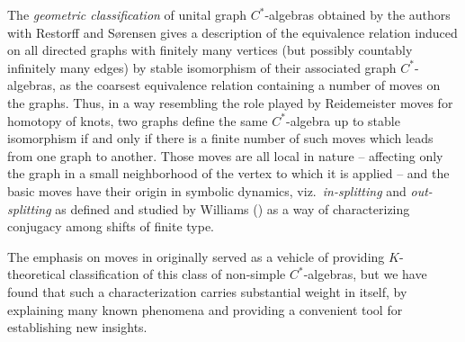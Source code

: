 \documentclass[12pt]{amsbook}%
\theoremstyle{defin}
\theoremstyle{remark}
\numberwithin{equation}{chapter}
\numberwithin{theor}{section}
\begin{document}
The \emph{geometric classification} of unital graph $C^*$-algebras obtained by the authors with Restorff and S\o{}rensen  gives a description of the equivalence relation induced on all directed graphs with finitely many vertices (but possibly countably infinitely many edges) by stable isomorphism of their associated graph $C^*$-algebras, as the coarsest equivalence relation containing a number of moves on the graphs. Thus, in a way resembling the role played by Reidemeister moves for homotopy of knots, two graphs define the same $C^*$-algebra up to stable isomorphism if and only if there is a finite number of such moves which leads  from one graph to another. Those moves are all local in nature -- affecting only the graph in a small neighborhood of the vertex to which it is applied -- and the basic moves have their origin in symbolic dynamics, viz.\ \emph{in-splitting} and \emph{out-splitting} as defined and studied by Williams (\cite{rfw:csft}) as a way of characterizing conjugacy among shifts of finite type.

The emphasis on moves in \cite{segrerapws:ccuggs} originally served as a vehicle of providing $K$-theoretical classification of this class of non-simple 	$C^*$-algebras, but we have found that such a characterization carries substantial weight in itself, by explaining many known phenomena and providing a convenient  tool for establishing new insights.
\end{document}
